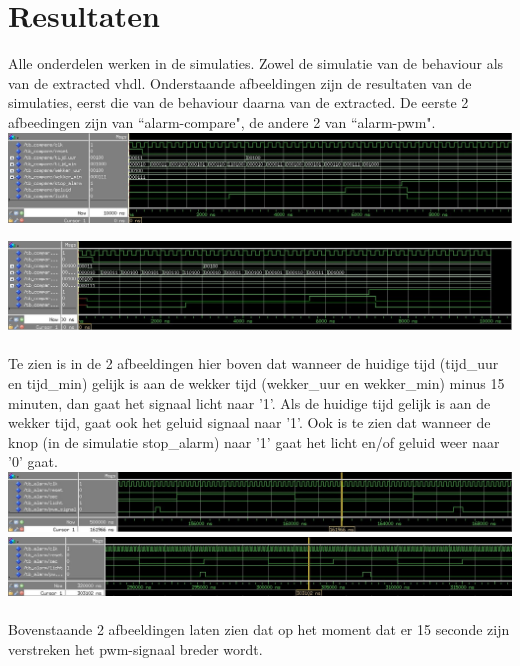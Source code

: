 \section{Resultaten}
Alle onderdelen werken in de simulaties. Zowel de simulatie van de behaviour als van de extracted vhdl.
Onderstaande afbeeldingen zijn de resultaten van de simulaties, eerst die van de behaviour daarna van de extracted.
De eerste 2 afbeedingen zijn van ``alarm-compare", de andere 2 van ``alarm-pwm".
\\

\includegraphics[width=\textwidth,height=\textheight,keepaspectratio]{results/compare.jpg}

\includegraphics[width=\textwidth,height=\textheight,keepaspectratio]{results/compare_ext.jpg}
\\
\\
Te zien is in de 2 afbeeldingen hier boven dat wanneer de huidige tijd (tijd\_uur en tijd\_min) gelijk is aan de wekker tijd (wekker\_uur en wekker\_min) minus 15 minuten, dan gaat het signaal licht naar '1'. Als de huidige tijd gelijk is aan de wekker tijd, gaat ook het geluid signaal naar '1'.
Ook is te zien dat wanneer de knop (in de simulatie stop\_alarm) naar '1' gaat het licht en/of geluid weer naar '0' gaat.
\\

\includegraphics[width=\textwidth,height=\textheight,keepaspectratio]{results/alarm.jpg}
\\

\includegraphics[width=\textwidth,height=\textheight,keepaspectratio]{results/alarm_ext.jpg}
\\
\\
Bovenstaande 2 afbeeldingen laten zien dat op het moment dat er 15 seconde zijn verstreken het pwm-signaal breder wordt.
